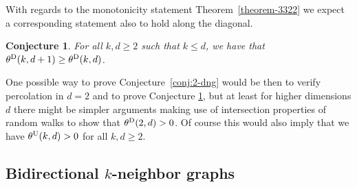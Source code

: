 \documentclass[a4paper, oneside, 11pt]{amsart}
\newtheorem{conj}[theorem]{Conjecture}
\theoremstyle{definition}
\newcommand{\1}{\mathbbm{1}}
\newcommand{\0}{\mathbf{o}}
\numberwithin{equation}{section}
\begin{document}
With regards to the monotonicity statement Theorem~\ref{theorem-3322} we expect a corresponding statement also to hold along the diagonal.
\begin{conj}\label{conj:dimensioncouple}
    For all $k,d\ge 2$ such that $k\leq d$, we have that $\theta^{\rm D}(k,d+1)\geq \theta^{\rm D}(k,d)$. 
\end{conj}

One possible way to prove Conjecture~\ref{conj:2-dng} would be then to verify percolation in $d=2$ and to prove Conjecture \ref{conj:dimensioncouple}, but at least for higher dimensions $d$ there might be simpler arguments making use of intersection properties of random walks to show that $\theta^{\rm D}(2,d) > 0$. Of course this would also imply that we have $\theta^{\rm U}(k,d)>0$ for all $k,d\geq2$.  

\subsection{Bidirectional $k$-neighbor graphs}
\end{document}
